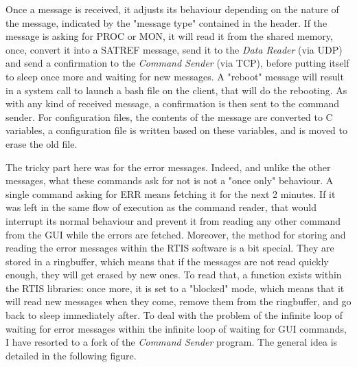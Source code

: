 \documentclass{themeensg}
\begin{document}
Once a message is received, it adjusts its behaviour depending on the nature of the message, indicated by the "message type" contained in the header. If the message is asking for PROC or MON, it will read it from the shared memory, once, convert it into a SATREF message, send it to the \textit{Data Reader} (via UDP) and send a confirmation to the \textit{Command Sender} (via TCP), before putting itself to sleep once more and waiting for new messages.
A "reboot" message will result in a system call to launch a bash file on the client, that will do the rebooting. As with any kind of received message, a confirmation is then sent to the command sender.
For configuration files, the contents of the message are converted to C variables, a configuration file is written based on these variables, and is moved to erase the old file.

The tricky part here was for the error messages. Indeed, and unlike the other messages, what these commands ask for not is not a "once only" behaviour. A single command asking for ERR means fetching it for the next 2 minutes. If it was left in the same flow of execution as the command reader, that would interrupt its normal behaviour and prevent it from reading any other command from the GUI while the errors are fetched.
Moreover, the method for storing and reading the error messages within the RTIS software is a bit special. They are stored in a ringbuffer, which means that if the messages are not read quickly enough, they will get erased by new ones. To read that, a function exists within the RTIS libraries: once more, it is set to a "blocked" mode, which means that it will read new messages when they come, remove them from the ringbuffer, and go back to sleep immediately after.
To deal with the problem of the infinite loop of waiting for error messages within the infinite loop of waiting for GUI commands, I have resorted to a fork of the \textit{Command Sender} program. The general idea is detailed in the following figure.
\end{document}
